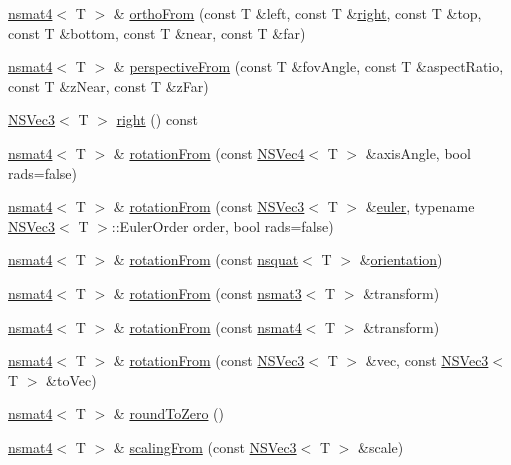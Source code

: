 \begin{DoxyCompactItemize}
\hyperlink{structnsmat4}{nsmat4}$<$ T $>$ \& \hyperlink{structnsmat4_a9a0bfd28799d6af327f6bb7fad32ce07}{ortho\-From} (const T \&left, const T \&\hyperlink{structnsmat4_a106a35a88a607861bc3af59bb59119a9}{right}, const T \&top, const T \&bottom, const T \&near, const T \&far)
\item 
\hyperlink{structnsmat4}{nsmat4}$<$ T $>$ \& \hyperlink{structnsmat4_aaf997f5ed8a0ffecc4d1dd59c019117b}{perspective\-From} (const T \&fov\-Angle, const T \&aspect\-Ratio, const T \&z\-Near, const T \&z\-Far)
\item 
\hyperlink{structNSVec3}{N\-S\-Vec3}$<$ T $>$ \hyperlink{structnsmat4_a106a35a88a607861bc3af59bb59119a9}{right} () const 
\item 
\hyperlink{structnsmat4}{nsmat4}$<$ T $>$ \& \hyperlink{structnsmat4_a08c2b17be9d635ee378928041dd9eb1d}{rotation\-From} (const \hyperlink{structNSVec4}{N\-S\-Vec4}$<$ T $>$ \&axis\-Angle, bool rads=false)
\item 
\hyperlink{structnsmat4}{nsmat4}$<$ T $>$ \& \hyperlink{structnsmat4_ad0b013ac37b01f65a8e275fb7961f629}{rotation\-From} (const \hyperlink{structNSVec3}{N\-S\-Vec3}$<$ T $>$ \&\hyperlink{nsvec3_8h_ac03cece5b2ce21941bb4b4a02ea7e2b6}{euler}, typename \hyperlink{structNSVec3}{N\-S\-Vec3}$<$ T $>$\-::Euler\-Order order, bool rads=false)
\item 
\hyperlink{structnsmat4}{nsmat4}$<$ T $>$ \& \hyperlink{structnsmat4_aa1a9042893740a093b65a94ec98350cb}{rotation\-From} (const \hyperlink{structnsquat}{nsquat}$<$ T $>$ \&\hyperlink{nsquat_8h_af20bc5e18c379261a387ab197e9b971f}{orientation})
\item 
\hyperlink{structnsmat4}{nsmat4}$<$ T $>$ \& \hyperlink{structnsmat4_a63fea40aee660df9d646db6aea883b93}{rotation\-From} (const \hyperlink{structnsmat3}{nsmat3}$<$ T $>$ \&transform)
\item 
\hyperlink{structnsmat4}{nsmat4}$<$ T $>$ \& \hyperlink{structnsmat4_af41da95328c4ee842e452bfff206070e}{rotation\-From} (const \hyperlink{structnsmat4}{nsmat4}$<$ T $>$ \&transform)
\item 
\hyperlink{structnsmat4}{nsmat4}$<$ T $>$ \& \hyperlink{structnsmat4_a20822a9b279e90403a5df0787ab7bca6}{rotation\-From} (const \hyperlink{structNSVec3}{N\-S\-Vec3}$<$ T $>$ \&vec, const \hyperlink{structNSVec3}{N\-S\-Vec3}$<$ T $>$ \&to\-Vec)
\item 
\hyperlink{structnsmat4}{nsmat4}$<$ T $>$ \& \hyperlink{structnsmat4_ae1195b31c0ae0c8b4a973118b735ab66}{round\-To\-Zero} ()
\item 
\hyperlink{structnsmat4}{nsmat4}$<$ T $>$ \& \hyperlink{structnsmat4_a7901f1210c5bebb26283b39465938817}{scaling\-From} (const \hyperlink{structNSVec3}{N\-S\-Vec3}$<$ T $>$ \&scale)

\end{DoxyCompactItemize}
